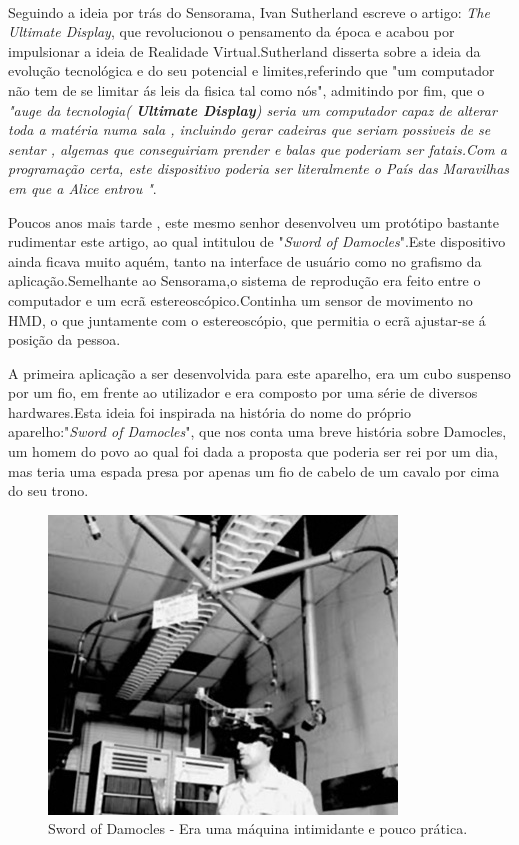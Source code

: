 \paragraph{}
Seguindo a ideia por trás do Sensorama, Ivan Sutherland escreve o artigo: \textit{The Ultimate Display}, que revolucionou o pensamento da época e acabou por impulsionar a ideia de Realidade Virtual.Sutherland disserta sobre a ideia da evolução tecnológica e do seu potencial e limites,referindo que "um computador não tem de se limitar ás leis da fisica tal como nós"\cite{11}, admitindo por fim, que o \textit{"auge da tecnologia(\textbf{ Ultimate Display}) seria um computador capaz de alterar toda a matéria numa sala , incluindo gerar cadeiras que seriam possiveis de se sentar , algemas que conseguiriam prender e balas que poderiam ser fatais.Com a programação certa, este dispositivo poderia ser literalmente o País das Maravilhas em que a Alice entrou "}\cite{11}.

Poucos anos mais tarde , este mesmo senhor desenvolveu um protótipo bastante rudimentar este artigo, ao qual intitulou de "\textit{Sword of Damocles}".Este dispositivo ainda ficava muito aquém, tanto na interface de usuário como no grafismo da aplicação.Semelhante ao Sensorama,o sistema de reprodução era feito entre o computador e um ecrã estereoscópico.Continha um sensor de movimento no HMD, o que juntamente com o estereoscópio, que permitia o ecrã ajustar-se á posição da pessoa.

A primeira aplicação a ser desenvolvida para este aparelho, era um cubo suspenso por um fio, em frente ao utilizador e era composto por uma série de diversos hardwares.Esta ideia foi inspirada na história do nome do próprio aparelho:"\textit{Sword of Damocles}", que nos conta uma breve história sobre Damocles, um homem do povo ao qual foi dada a proposta que poderia ser rei por um dia, mas teria uma espada presa por apenas um fio de cabelo de um cavalo por cima do seu trono. 
\begin{figure}
\center
\includegraphics[scale=0.4]{imagens/SOD.jpg}
\caption{Sword of Damocles -  Era uma máquina intimidante e pouco prática. \cite{6}}
\end{figure}
